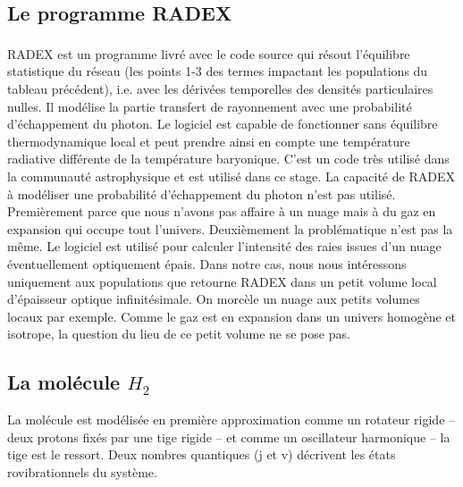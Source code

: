 \documentclass[10pt, a4paper]{report}
\numberwithin{equation}{subsection}
\begin{document}



\subsection{Le programme RADEX}
RADEX\textsuperscript{\cite{RADEX}} est un programme livré avec le code source qui résout l'équilibre statistique du réseau (les points 1-3 des termes impactant les populations du tableau précédent), i.e. avec les dérivées temporelles des densités particulaires nulles. Il modélise la partie transfert de rayonnement avec une probabilité d'échappement du photon. Le logiciel est capable de fonctionner sans équilibre thermodynamique local et peut prendre ainsi en compte une température radiative différente de la température baryonique. C'est un code très utilisé dans la communauté astrophysique et est utilisé dans ce stage. La capacité de RADEX à modéliser une probabilité d'échappement du photon n'est pas utilisé. Premièrement parce que nous n'avons pas affaire à un nuage mais à du gaz en expansion qui occupe tout l'univers. Deuxièmement la problématique n'est pas la même. Le logiciel est utilisé pour calculer l'intensité des raies issues d'un nuage éventuellement optiquement épais. Dans notre cas, nous nous intéressons uniquement aux populations que retourne RADEX dans un petit volume local d'épaisseur optique infinitésimale. On morcèle un nuage aux petits volumes locaux par exemple. Comme le gaz est en expansion dans un univers homogène et isotrope, la question du lieu de ce petit volume ne se pose pas.     
\subsection{La molécule $H_2$}
La molécule est modélisée en première approximation comme un rotateur rigide -- deux protons fixés par une tige rigide -- et comme un oscillateur harmonique -- la tige est le ressort. Deux nombres quantiques (j et v) décrivent les états rovibrationnels du système.  
\end{document}
